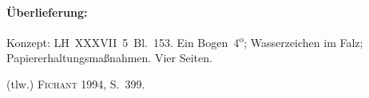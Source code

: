 %  
%				
%
%
%
%
%
\frenchspacing
%
\begin{ledgroupsized}[r]{120mm}
\footnotesize
\pstart
\noindent\textbf{Überlieferung:}
\pend
\end{ledgroupsized}
%
\begin{ledgroupsized}[r]{114mm}
\footnotesize
\pstart \parindent -6mm
%
Konzept:
LH~XXXVII~5~Bl.~153. 
Ein Bogen~4\textsuperscript{o};
Wasserzeichen im Falz;
Papiererhaltungsmaßnahmen.
Vier Seiten.
\pend
\end{ledgroupsized}
%
\begin{ledgroupsized}[r]{114mm}
\footnotesize
\pstart
\parindent -6mm
%
(tlw.) \cite{01056}\textsc{Fichant} 1994, S.~399.
\pend%
\end{ledgroupsized}
%
%
\vspace{5mm}
